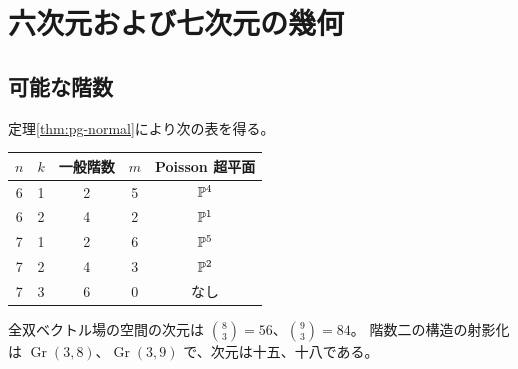 \section{六次元および七次元の幾何}\label{sec:pg-six-seven}
\subsection{可能な階数}
定理\ref{thm:pg-normal}により次の表を得る。
\begin{center}
\begin{tabular}{ccccc}\toprule
$n$ & $k$ & 一般階数 & $m$ & Poisson 超平面\\\midrule
6&1&2&5&$\mathbb P^4$\\
6&2&4&2&$\mathbb P^1$\\
7&1&2&6&$\mathbb P^5$\\
7&2&4&3&$\mathbb P^2$\\
7&3&6&0&なし\\\bottomrule
\end{tabular}
\end{center}
全双ベクトル場の空間の次元は $\binom83=56$、$\binom93=84$。
階数二の構造の射影化は $\operatorname{Gr}(3,8)$、$\operatorname{Gr}(3,9)$ で、次元は十五、十八である。


